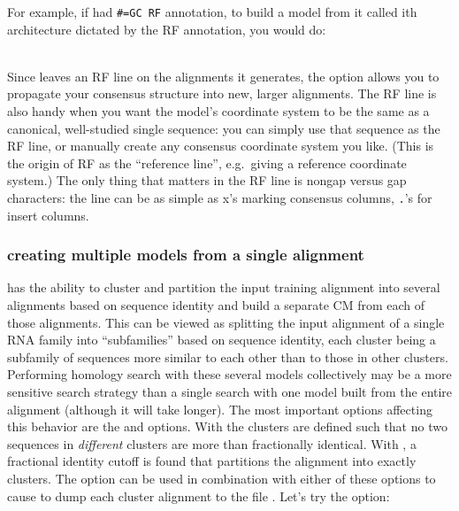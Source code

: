 For example, if  had {\small\verb+#=GC RF+}
annotation, to build a model from it called  
ith architecture dictated by the RF annotation, you
would do:

\\

Since  leaves an RF line on the alignments it generates,
the  option allows you to propagate your consensus
structure into new, larger alignments. The RF line is also handy when
you want the model's coordinate system to be the same as a canonical,
well-studied single sequence: you can simply use that sequence as the
RF line, or manually create any consensus coordinate system you like.
(This is the origin of RF as the ``reference line'', e.g.\ giving a
reference coordinate system.) The only thing that matters in the RF
line is nongap versus gap characters: the line can be as simple as x's
marking consensus columns, \verb+.+'s for insert columns.

\subsubsection{creating multiple models from a single alignment}
 has the ability to cluster and partition the input training
alignment into several alignments based on sequence identity and build
a separate CM from each of those alignments. This can be viewed as splitting
the input alignment of a single RNA family into ``subfamilies'' based on
sequence identity, each cluster being a subfamily of sequences more
similar to each other than to those in other clusters.
Performing homology search with these several models
collectively may be a more sensitive search strategy than a single
search with one model built from the entire alignment (although it
will take longer). The most important options affecting this behavior
are the  and  options. With
 the clusters are defined such that no two
sequences in \emph{different} clusters are more than 
fractionally identical. With , a fractional identity
cutoff is found that partitions the alignment into exactly 
clusters. The  option can be used in combination
with either of these options to cause  to dump each
cluster alignment to the file . Let's try the 
 option: 

